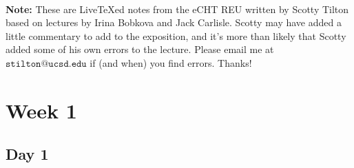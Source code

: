 \documentclass{book}
\begin{document}
    \maketitle

    ~
    \vspace{3in}
    \begin{center}
        \noindent \textbf{Note:} These are Live\TeX ed notes from the eCHT REU written by Scotty Tilton based on lectures by Irina Bobkova and Jack Carlisle. Scotty may have added a little commentary to add to the exposition, and it's more than likely that Scotty added some of his own errors to the lecture. Please email me at $\texttt{stilton@ucsd.edu}$ if (and when) you find errors. Thanks!
    \end{center}
    \tableofcontents
    \chapter{Week 1}
    \section{Day 1}
    
    
    \newpage
    
    
    \newpage
    
    
    \newpage
    
    \newpage
    
    \newpage
    

    \newpage
    
    \newpage
    \newpage
    
    
    \printindex
\end{document}
